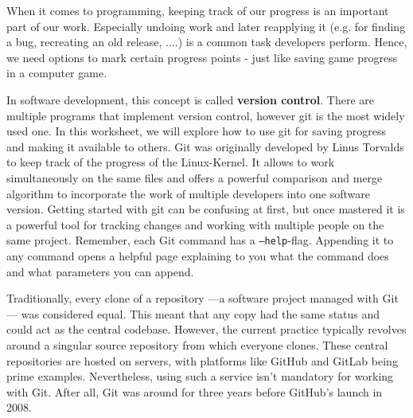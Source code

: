\documentclass{dcbl/challenge}
\begin{document}
When it comes to programming, keeping track of our progress is an important part of our work. Especially undoing work and later reapplying it (e.g. for finding a bug, recreating an old release, ....) is a common task developers perform. Hence, we need options to mark certain progress points - just like saving game progress in a computer game.

In software development, this concept is called \textbf{version control}. There are multiple programs that implement version control, however git is the most widely used one. In this worksheet, we will explore how to use git for saving progress and making it available to others.
Git was originally developed by Linus Torvalds to keep track of the progress of the Linux-Kernel. It allows to work simultaneously on the same files and offers a powerful comparison and merge algorithm to incorporate the work of multiple developers into one software version.
Getting started with git can be confusing at first, but once mastered it is a powerful tool for tracking changes and working with multiple people on the same project.
Remember, each Git command has a \texttt{--help}-flag. Appending it to any command opens a helpful page explaining to you what the command does and what parameters you can append.

Traditionally, every clone of a repository —a software project managed with Git— was considered equal. This meant that any copy had the same status and could act as the central codebase. However, the current practice typically revolves around a singular source repository from which everyone clones. These central repositories are hosted on servers, with platforms like GitHub and GitLab being prime examples. Nevertheless, using such a service isn't mandatory for working with Git. After all, Git was around for three years before GitHub's launch in 2008.
\end{document}
